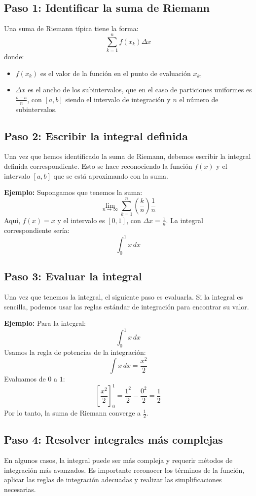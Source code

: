 \documentclass[answers]{exam} %
\begin{document}
\subsection{Paso 1: Identificar la suma de Riemann}
Una suma de Riemann típica tiene la forma:
\[
\sum_{k=1}^{n} f\left( x_k \right) \Delta x
\]
donde:
\begin{itemize}
    \item \( f(x_k) \) es el valor de la función en el punto de evaluación \( x_k \),
    \item \( \Delta x \) es el ancho de los subintervalos, que en el caso de particiones uniformes es \( \frac{b - a}{n} \), con \( [a, b] \) siendo el intervalo de integración y \( n \) el número de subintervalos.
\end{itemize}

\subsection{Paso 2: Escribir la integral definida}
Una vez que hemos identificado la suma de Riemann, debemos escribir la integral definida correspondiente. Esto se hace reconociendo la función \( f(x) \) y el intervalo \( [a, b] \) que se está aproximando con la suma.

\textbf{Ejemplo:}
Supongamos que tenemos la suma:
\[
\lim_{n \to \infty} \sum_{k=1}^{n} \left( \frac{k}{n} \right) \frac{1}{n}
\]
Aquí, \( f(x) = x \) y el intervalo es \( [0, 1] \), con \( \Delta x = \frac{1}{n} \). La integral correspondiente sería:
\[
\int_0^1 x \, dx
\]

\subsection{Paso 3: Evaluar la integral}
Una vez que tenemos la integral, el siguiente paso es evaluarla. Si la integral es sencilla, podemos usar las reglas estándar de integración para encontrar su valor.

\textbf{Ejemplo:}
Para la integral:
\[
\int_0^1 x \, dx
\]
Usamos la regla de potencias de la integración:
\[
\int x \, dx = \frac{x^2}{2}
\]
Evaluamos de \( 0 \) a \( 1 \):
\[
\left[ \frac{x^2}{2} \right]_0^1 = \frac{1^2}{2} - \frac{0^2}{2} = \frac{1}{2}
\]
Por lo tanto, la suma de Riemann converge a \( \frac{1}{2} \).

\subsection{Paso 4: Resolver integrales más complejas}
En algunos casos, la integral puede ser más compleja y requerir métodos de integración más avanzados. Es importante reconocer los términos de la función, aplicar las reglas de integración adecuadas y realizar las simplificaciones necesarias.
\end{document}
